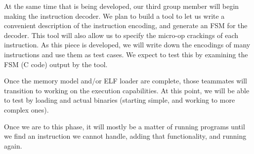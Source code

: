 \documentclass[12pt]{article}
\begin{document}
At the same time that is being developed, our third group member will
begin making the instruction decoder.  We plan to build a tool to let
us write a convenient description of the instruction encoding, and
generate an FSM for the decoder.  This tool will also allow us to
specify the micro-op crackings of each instruction. As this piece is
developed, we will write down the encodings of many instructions and
use them as test cases.  We expect to test this by examining the FSM
(C code) output by the tool.

Once the memory model and/or ELF loader are complete, those teammates
will transition to working on the execution capabilities. At this
point, we will be able to test by loading and actual binaries
(starting simple, and working to more complex ones).

Once we are to this phase, it will mostly be a matter of running
programs until we find an instruction we cannot handle, adding
that functionality, and running again.
\end{document}
